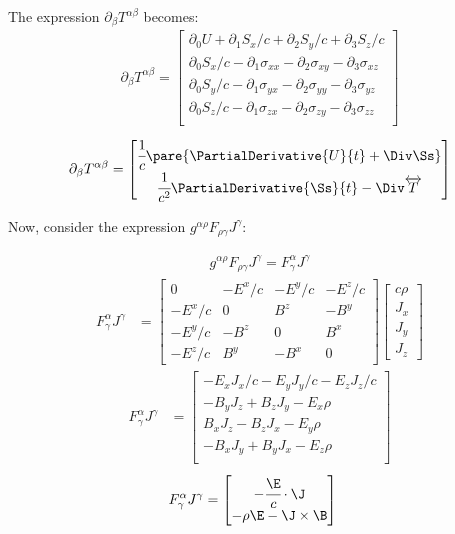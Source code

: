   The expression $\partial_\beta T^{\alpha\beta}$ becomes:
  \begin{align}
    \partial_\beta T^{\alpha\beta} = \begin{bmatrix}
      \partial_0 U + \partial_1S_x/c + \partial_2S_y/c + \partial_3S_z/c \\
      \partial_0 S_x/c -\partial_1\sigma_{xx} -\partial_2\sigma_{xy} -\partial_3\sigma_{xz} \\
      \partial_0 S_y/c -\partial_1\sigma_{yx}  -\partial_2\sigma_{yy}  -\partial_3\sigma_{yz} \\
      \partial_0 S_z/c  -\partial_1\sigma_{zx}  -\partial_2\sigma_{zy}  -\partial_3\sigma_{zz} \\
  \end{bmatrix}
  \end{align}
  \begin{align}
    \partial_\beta T^{\alpha\beta} =
    \begin{bmatrix}
      \cfrac{1}{c} \pare{\PartialDerivative{U}{t} + \Div \Ss} \\
      \cfrac{1}{c^2}\PartialDerivative{\Ss}{t} - \Div \overleftrightarrow{T}
    \end{bmatrix}
  \end{align}

  Now, consider the expression $g^{\alpha\rho}F_{\rho\gamma}J^\gamma$:

  \begin{align}
    g^{\alpha\rho}F_{\rho\gamma}J^\gamma = F^\alpha_\gamma J^\gamma
  \end{align}
  \begin{align}
    F^\alpha_\gamma J^\gamma &= \left[\begin{smallmatrix}
      0 & -E^x/c & -E^y/c & -E^z/c \\
      -E^x/c & 0 & B^z & -B^y \\
      -E^y/c & -B^z & 0 & B^x \\
      -E^z/c & B^y & -B^x & 0
    \end{smallmatrix}\right]\left[\begin{smallmatrix}
      c\rho \\ J_x \\ J_y \\ J_z
  \end{smallmatrix}\right]
  \end{align}
  \begin{align}
    F^\alpha_\gamma J^\gamma &= \begin{bmatrix}
      -E_xJ_x/c - E_yJ_y/c - E_zJ_z/c \\
      -B_yJ_z + B_zJ_y -E_x\rho \\
      B_xJ_z - B_zJ_x -E_y\rho \\
      -B_xJ_y + B_yJ_x -E_z\rho \\
    \end{bmatrix}
  \end{align}
  \begin{align}
    F^\alpha_\gamma J^\gamma &= \begin{bmatrix}
      -\cfrac{\E}{c}\cdot \J \\
      - \rho\E - \J\times\B
  \end{bmatrix}
  \end{align}

